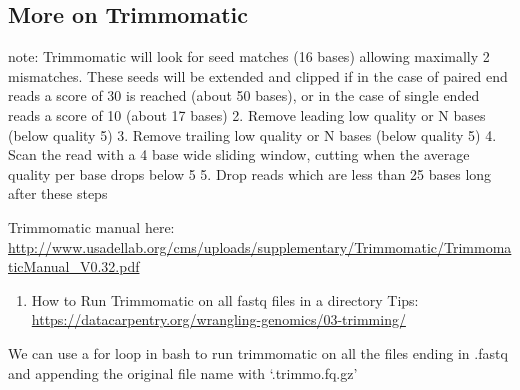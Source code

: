 \documentclass[]{article}
\newenvironment{Shaded}{\begin{snugshade}}{\end{snugshade}}
\newcommand{\ExtensionTok}[1]{#1}
\newcommand{\FunctionTok}[1]{\textcolor[rgb]{0.00,0.00,0.00}{#1}}
\newcommand{\KeywordTok}[1]{\textcolor[rgb]{0.13,0.29,0.53}{\textbf{#1}}}
\newcommand{\NormalTok}[1]{#1}
\newcommand{\VariableTok}[1]{\textcolor[rgb]{0.00,0.00,0.00}{#1}}
\providecommand{\tightlist}{%
  \setlength{\itemsep}{0pt}\setlength{\parskip}{0pt}}
\begin{document}
\hypertarget{more-on-trimmomatic}{%
\subsection{More on Trimmomatic}\label{more-on-trimmomatic}}

note: Trimmomatic will look for seed matches (16 bases) allowing
maximally 2 mismatches. These seeds will be extended and clipped if in
the case of paired end reads a score of 30 is reached (about 50 bases),
or in the case of single ended reads a score of 10 (about 17 bases) 2.
Remove leading low quality or N bases (below quality 5) 3. Remove
trailing low quality or N bases (below quality 5) 4. Scan the read with
a 4 base wide sliding window, cutting when the average quality per base
drops below 5 5. Drop reads which are less than 25 bases long after
these steps

Trimmomatic manual here:
\url{http://www.usadellab.org/cms/uploads/supplementary/Trimmomatic/TrimmomaticManual_V0.32.pdf}

\begin{enumerate}
\def\labelenumi{\arabic{enumi}.}
\setcounter{enumi}{1}
\tightlist
\item
  How to Run Trimmomatic on all fastq files in a directory Tips:
  \url{https://datacarpentry.org/wrangling-genomics/03-trimming/}
\end{enumerate}

We can use a for loop in bash to run trimmomatic on all the files ending
in .fastq and appending the original file name with `.trimmo.fq.gz'

\begin{Shaded}
\end{Shaded}
\end{document}
